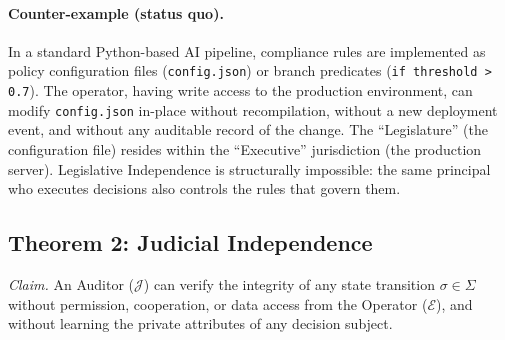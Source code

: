 \paragraph{Counter-example (status quo).}
In a standard Python-based AI pipeline, compliance rules are
implemented as policy configuration files (\texttt{config.json}) or
branch predicates (\texttt{if threshold > 0.7}). The operator, having
write access to the production environment, can modify
\texttt{config.json} in-place without recompilation, without a new
deployment event, and without any auditable record of the change.
The ``Legislature'' (the configuration file) resides within the
``Executive'' jurisdiction (the production server). Legislative
Independence is structurally impossible: the same principal who executes
decisions also controls the rules that govern them.

\subsection{Theorem 2: Judicial Independence}
\label{subsec:proof-jud}

\textit{Claim.} An Auditor ($\mathcal{J}$) can verify the integrity of
any state transition $\sigma \in \Sigma$ without permission,
cooperation, or data access from the Operator ($\mathcal{E}$), and
without learning the private attributes of any decision subject.


